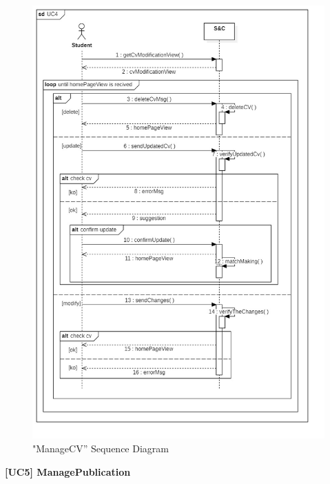 \documentclass{article}
\begin{document}
\begin{figure}[H]
    \centering
    \includegraphics[width=1\linewidth]{sequenceDiagrams/UC4.jpg}
    \caption{"ManageCV” Sequence Diagram}
    \label{fig:enter-label}
\end{figure}
\vspace{1cm}
\textbf{[UC5] ManagePublication}
\end{document}
